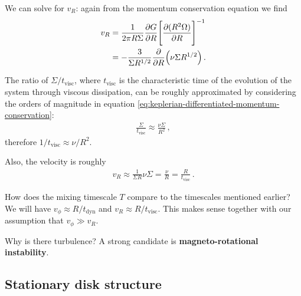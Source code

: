 \documentclass[main.tex]{subfiles}
\begin{document}
We can solve for \(v_R\): again from the momentum conservation equation we find 
%
\begin{align}
v_R &= \frac{1}{2 \pi R \Sigma } \pdv{G}{R} \qty[\pdv{(R^2 \Omega )}{R}]^{-1}  \\
&= - \frac{3}{\Sigma R^{1/ 2} } \pdv{}{R} \qty(\nu \Sigma R^{ 1/ 2}) 
\,.
\end{align}

The ratio of \(\Sigma / t _{\text{visc}}\), where \(t _{\text{visc}}\) is the characteristic time of the evolution of the system through viscous dissipation, can be roughly approximated by considering the orders of magnitude in equation \eqref{eq:keplerian-differentiated-momentum-conservation}:
%
\begin{align}
\frac{\Sigma}{ t _{\text{visc}}} \approx \frac{\nu \Sigma }{R^2}
\,,
\end{align}
%
therefore \( 1/ t _{\text{visc}} \approx \nu / R^2\).

Also, the velocity is roughly 
%
\begin{align}
v_R \approx \frac{1}{\Sigma R} \nu \Sigma = \frac{\nu}{R} = \frac{R}{ t _{\text{visc}}}
\,.
\end{align}

How does the mixing timescale \(T\) compare to the timescales mentioned earlier? 
We will have \(v_\phi \approx R / t _{\text{dyn}}\) and \(v_R \approx R / t _{\text{visc}}\). 
This makes sense together with our assumption that \(v_\phi \gg v_R\). 

Why is there turbulence? A strong candidate is \textbf{magneto-rotational instability}. 

\subsection{Stationary disk structure}
\end{document}
